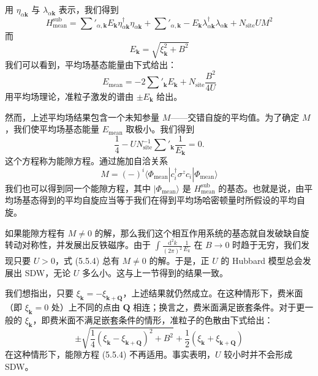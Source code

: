 用 $\eta_{\alpha\pmb{k}}$ 与 $\lambda_{\alpha\pmb{k}}$ 表示，我们得到
\begin{equation*}
H^{\mathrm{sub}}_{\mathrm{mean}}=\sum'_{\alpha,\pmb{k}}E_{\pmb{k}}\eta^{\dagger}_{\alpha\pmb{k}}\eta_{\alpha\pmb{k}}+\sum'_{\alpha,\pmb{k}}-E_{\pmb{k}}\lambda^{\dagger}_{\alpha\pmb{k}}\lambda_{\alpha\pmb{k}}+N_{\mathrm{site}}UM^{2}
\end{equation*}
而
\begin{equation*}
E_{\pmb{k}}=\sqrt{\xi^{2}_{\pmb{k}}+B^{2}}
\end{equation*}
我们可以看到，平均场基态能量由下式给出：
\begin{equation*}
E_{\mathrm{mean}}=-2\sum'_{\pmb{k}}E_{\pmb{k}}+N_{\mathrm{site}}\frac{B^{2}}{4U}
\end{equation*}
用平均场理论，准粒子激发的谱由 $\pm E_{\pmb{k}}$ 给出。

然而，上述平均场结果包含一个未知参量 $M$——交错自旋的平均值。为了确定 $M$，我们使平均场基态能量 $E_{\mathrm{mean}}$ 取极小。我们得到
\begin{equation*}
\frac{1}{4}-UN^{-1}_{\mathrm{site}}\sum'_{\pmb{k}}\frac{1}{E_{\pmb{k}}}=0.\tag{5.5.4}
\end{equation*}
这个方程称为能隙方程。通过施加自洽关系
\begin{equation*}
M=(-)^{i}\langle \Phi_{\mathrm{mean}}|c^{\dagger}_{i}\sigma^{z}c_{i}|\Phi_{\mathrm{mean}}\rangle
\end{equation*}
我们也可以得到同一个能隙方程，其中 $|\Phi_{\mathrm{mean}}\rangle$ 是 $H^{\mathrm{sub}}_{\mathrm{mean}}$ 的基态。也就是说，由平均场基态得到的平均自旋应当等于我们在得到平均场哈密顿量时所假设的平均自旋。

如果能隙方程有 $M\neq 0$ 的解，那么我们这个相互作用系统的基态就自发破缺自旋转动对称性，并发展出反铁磁序。由于 $\int\frac{\mathrm{d}^{2}k}{(2\pi)^{2}}\frac{1}{E_{k}}$ 在 $B\to 0$ 时趋于无穷，我们发现只要 $U>0$，式 (5.5.4) 总有 $M\neq 0$ 的解。于是，正 $U$ 的 Hubbard 模型总会发展出 SDW，无论 $U$ 多么小。这与上一节得到的结果一致。

我们想指出，只要 $\xi_{\pmb{k}}=-\xi_{\pmb{k}+\pmb{Q}}$，上述结果就仍然成立。在这种情形下，费米面（即 $\xi_{\pmb{k}}=0$ 处）上不同的点由 $\pmb{Q}$ 相连；换言之，费米面满足嵌套条件。对于更一般的 $\xi_{\pmb{k}}$，即费米面不满足嵌套条件的情形，准粒子的色散由下式给出：
\begin{equation*}
\pm\sqrt{\frac{1}{4}(\xi_{\pmb{k}}-\xi_{\pmb{k}+\pmb{Q}})^{2}+B^{2}}+\frac{1}{2}(\xi_{\pmb{k}}+\xi_{\pmb{k}+\pmb{Q}})
\end{equation*}
在这种情形下，能隙方程 (5.5.4) 不再适用。事实表明，$U$ 较小时并不会形成 SDW。

